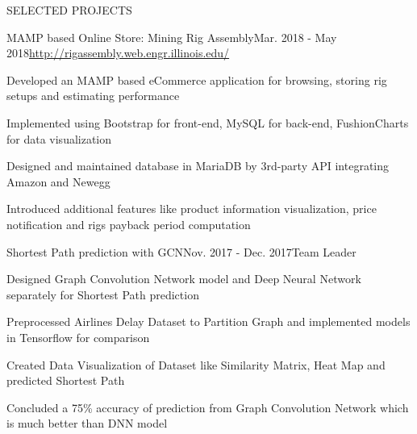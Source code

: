 \documentclass{resume} %
\begin{document}
\begin{rSection}{SELECTED PROJECTS}

\begin{rSubsection}{MAMP based Online Store: Mining Rig Assembly}{Mar. 2018 - May 2018}{\url{http://rigassembly.web.engr.illinois.edu/}}{}
\item Developed an MAMP based eCommerce application for browsing, storing rig setups and estimating performance
\item Implemented using Bootstrap for front-end, MySQL for back-end, FushionCharts for data visualization
\item Designed and maintained database in MariaDB by 3rd-party API integrating Amazon and Newegg
\item Introduced additional features like product information visualization, price notification and rigs payback period computation
\end{rSubsection}


\begin{rSubsection}{Shortest Path prediction with GCN}{Nov. 2017 - Dec. 2017}{Team Leader}{}
\item Designed Graph Convolution Network model and Deep Neural Network separately for Shortest Path prediction
\item Preprocessed Airlines Delay Dataset to Partition Graph and implemented models in Tensorflow for comparison
\item Created Data Visualization of Dataset like Similarity Matrix, Heat Map and predicted Shortest Path
\item Concluded a 75\% accuracy of prediction from Graph Convolution Network which is much better than DNN model
\end{rSubsection}


\end{rSection} 
\end{document}
